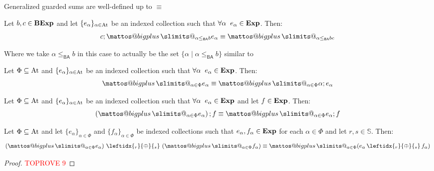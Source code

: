 \documentclass[a4paper,UKenglish,cleveref, autoref, thm-restate]{lipics-v2021}
\makeatletter
\newcommand{\At}{\text{\upshape{At}}}
\newcommand{\Exp}{\textbf{\upshape{Exp}}}
\newcommand{\BA}{\textsf{BA}}
\newcommand{\BExp}{\textbf{\upshape{BExp}}}
\newcommand{\WC}[2]{\,\leftidx{_{#1}}{{\oplus}}{_{#2}}\,}
\theoremstyle{plain}\newtheoremrep{thm}{Theorem}[section]
\newcommand{\bigplus}{\DOTSB\mathop{\mathpalette\mattos@bigplus\relax}\slimits@
}
\newcommand\mattos@bigplus[2]{\vcenter{\hbox{\sbox\z@{$#1\sum$}\resizebox{!}{0.9\dimexpr\ht\z@+\dp\z@}{\raisebox{\depth}{$\m@th#1+$}}}}\vphantom{\sum}}
\makeatother
\begin{document}
		\begin{toappendix}
			\label{FTapx}
		\begin{lem} 
			Generalized guarded sums are well-defined up to $\equiv$ \label{lem52}
		\end{lem}
		\begin{lem}
			Let $b,c \in \BExp$ and let $\{e_\alpha\}_{\alpha \in \At}$ be an indexed collection such that $\forall \alpha \;\; e_\alpha \in \Exp$. Then:
			$$
				c;\bigplus_{\alpha \leq_{\BA} b} e_\alpha \equiv \bigplus_{\alpha \leq_{\BA} bc}
			$$
		\end{lem}
		Where we take $\alpha \leq_{\BA} b$ in this case to actually be the set $\{\alpha \mid \alpha \leq_{\BA} b\}$ similar to \cite{Smolka_2019, rozowski2023probabilistic}
		\begin{lem}
			Let $\Phi \subseteq \At$ and $\{e_\alpha\}_{\alpha \in \At}$ be an indexed collection such that $\forall \alpha \;\; e_\alpha \in \Exp$. Then:
			$$
				\bigplus_{\alpha \in \Phi} e_\alpha \equiv \bigplus_{\alpha \in \Phi} \alpha;e_\alpha
			$$\label{lem54}
		\end{lem}
		\begin{lem}
			Let $\Phi \subseteq \At$ and $\{e_\alpha\}_{\alpha \in \At}$ be an indexed collection such that $\forall \alpha \;\; e_\alpha \in \Exp$ and let $f \in \Exp$. Then:
			$$
				\left( \bigplus_{\alpha \in \Phi} e_\alpha \right);f  \equiv \bigplus_{\alpha \in \Phi} e_\alpha;f
			$$\label{lem55}
		\end{lem}
		\begin{lem}\label{lem56}
			Let $\Phi \subseteq \At$ and let $\{e_\alpha\}_{\alpha \in \Phi}$ and $\{f_\alpha\}_{\alpha \in \Phi}$ be indexed collections such that $e_\alpha, f_\alpha \in \Exp$ for each $\alpha \in \Phi$ and let $r,s \in \mathbb S$. Then:
			$$\left(\bigplus_{\alpha \in \Phi}e_\alpha\right) \WC{r}{s} \left(\bigplus_{\alpha \in \Phi}f_\alpha\right) \equiv \bigplus_{\alpha \in \Phi}(e_\alpha \WC{r}{s} f_\alpha)$$
		\end{lem}
		\begin{proof}\textcolor{red}{TOPROVE 9}\end{proof}
	\end{toappendix}
		
\end{document}
